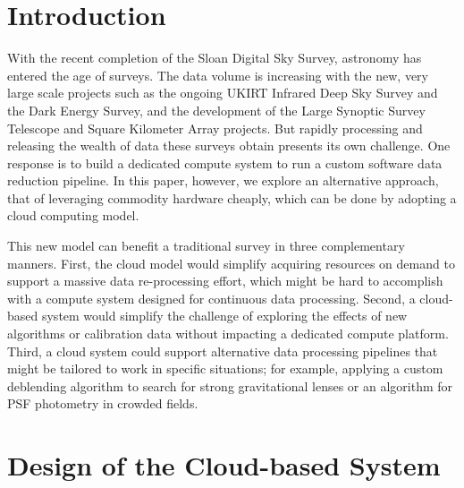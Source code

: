 \section{Introduction}
With the recent completion of the Sloan Digital Sky Survey, astronomy has entered the age of surveys. The data volume is increasing with the new, very large scale projects such as the ongoing UKIRT Infrared Deep Sky Survey and the Dark Energy Survey, and the development of the Large Synoptic Survey Telescope and Square Kilometer Array projects. But rapidly processing and releasing the wealth of data these surveys obtain presents its own challenge. One response is to build a dedicated compute system to run a custom software data reduction pipeline. In this paper, however, we explore an alternative approach, that of leveraging commodity hardware cheaply, which can be done by adopting a cloud computing model. 

This new model can benefit a traditional survey in three complementary manners. First, the cloud model would simplify acquiring resources on demand to support a massive data re-processing effort, which might be hard to accomplish with a compute system designed for continuous data processing. Second, a cloud-based system would simplify the challenge of exploring the effects of new algorithms or calibration data without impacting a dedicated compute platform. Third, a cloud system could support alternative data processing pipelines that might be tailored to work in specific situations; for example, applying a custom deblending algorithm to search for strong gravitational lenses or an algorithm for PSF photometry in crowded fields. 

\section{Design of the Cloud-based System}

